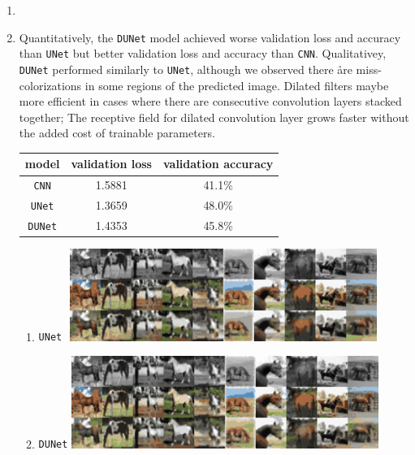 \documentclass[11pt]{article}
\begin{document}
\begin{enumerate}
    \item 
    \item Quantitatively, the \texttt{DUNet} model achieved worse validation loss and accuracy than \texttt{UNet} but better validation loss and accuracy than \texttt{CNN}. Qualitativey, \texttt{DUNet} performed similarly to \texttt{UNet}, although we observed there åre miss-colorizations in some regions of the predicted image. Dilated filters maybe more efficient in cases where there are consecutive convolution layers stacked together; The receptive field for dilated convolution layer grows faster without the added cost of trainable parameters.
    \begin{center} 
        \begin{tabular}{c | c c}
            model & validation loss & validation accuracy \\
            \hline 
            \texttt{CNN} & 1.5881 & 41.1\%\\
            \texttt{UNet} & 1.3659 & 48.0\%\\
            \texttt{DUNet} & 1.4353 & 45.8\%\\
        \end{tabular}
    \end{center}
    \begin{enumerate}
        \item \texttt{UNet} \,\,\includegraphics[width=10cm]{eval_UNet.png} 
        \item \texttt{DUNet} \includegraphics[width=10cm]{eval_DUNet.png} 
    \end{enumerate}
\end{enumerate}
\end{document}
